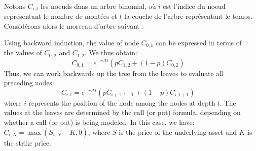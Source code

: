Notons $C_{i,t}$ les noeuds dans un arbre binomial, où $i$ est l'indice du noeud représentant le nombre de montées et $t$ la couche de l'arbre représentant le temps. \\
Considérons alors le morceau d'arbre suivant :
\begin{center}
\end{center}

Using backward induction, the value of node $C_{0,1}$ can be expressed in terms of the values of $C_{0,2}$ and $C_{1,2}$. We thus obtain:
$$C_{0,1} = e^{-r \Delta t}(pC_{1,2}+(1-p)C_{0,2})$$
Thus, we can work backwards up the tree from the leaves to evaluate all preceding nodes:
$$C_{i,t}=e^{-r \Delta t}(pC_{i+1,t+1}+(1-p)C_{i,t+1})$$
where $i$ represents the position of the node among the nodes at depth $t$.
The values at the leaves are determined by the call (or put) formula, depending on whether a call (or put) is being modeled. 
In this case, we have: $C_{i,N} = \max(S_{i,N}-K,0)$, where $S$ is the price of the underlying asset and $K$ is the strike price.

\vspace{0.2cm}

